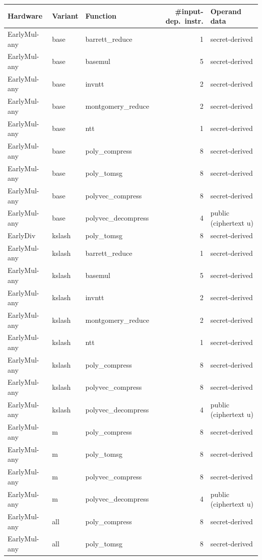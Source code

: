 \begin{tabular}{lllrl}\toprule
Hardware & Variant & Function & \#input-dep.\ instr. & Operand data \\\midrule
EarlyMul-any & base & barrett\_reduce & 1 & secret-derived \\
EarlyMul-any & base & basemul & 5 & secret-derived \\
EarlyMul-any & base & invntt & 2 & secret-derived \\
EarlyMul-any & base & montgomery\_reduce & 2 & secret-derived \\
EarlyMul-any & base & ntt & 1 & secret-derived \\
EarlyMul-any & base & poly\_compress & 8 & secret-derived \\
EarlyMul-any & base & poly\_tomsg & 8 & secret-derived \\
EarlyMul-any & base & polyvec\_compress & 8 & secret-derived \\
EarlyMul-any & base & polyvec\_decompress & 4 & public (ciphertext u) \\
EarlyDiv & kslash & poly\_tomsg & 8 & secret-derived \\
EarlyMul-any & kslash & barrett\_reduce & 1 & secret-derived \\
EarlyMul-any & kslash & basemul & 5 & secret-derived \\
EarlyMul-any & kslash & invntt & 2 & secret-derived \\
EarlyMul-any & kslash & montgomery\_reduce & 2 & secret-derived \\
EarlyMul-any & kslash & ntt & 1 & secret-derived \\
EarlyMul-any & kslash & poly\_compress & 8 & secret-derived \\
EarlyMul-any & kslash & polyvec\_compress & 8 & secret-derived \\
EarlyMul-any & kslash & polyvec\_decompress & 4 & public (ciphertext u) \\
EarlyMul-any & m & poly\_compress & 8 & secret-derived \\
EarlyMul-any & m & poly\_tomsg & 8 & secret-derived \\
EarlyMul-any & m & polyvec\_compress & 8 & secret-derived \\
EarlyMul-any & m & polyvec\_decompress & 4 & public (ciphertext u) \\
EarlyMul-any & all & poly\_compress & 8 & secret-derived \\
EarlyMul-any & all & poly\_tomsg & 8 & secret-derived \\

\end{tabular}
